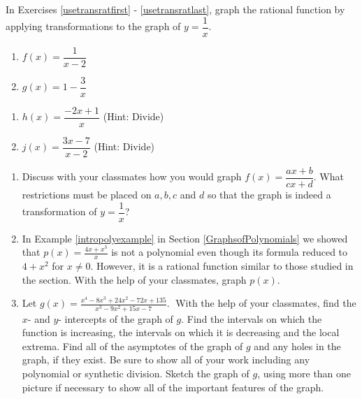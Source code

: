 In Exercises \ref{usetransratfirst} - \ref{usetransratlast}, graph the rational function by applying transformations to the graph of $y = \dfrac{1}{x}$.

\begin{multicols}{2}
\begin{enumerate}
\setcounter{enumi}{\value{HW}}

\item $f(x) = \dfrac{1}{x - 2}$ \label{usetransratfirst}
\item $g(x) = 1 - \dfrac{3}{x}$

\setcounter{HW}{\value{enumi}}
\end{enumerate}
\end{multicols}

\begin{multicols}{2}
\begin{enumerate}
\setcounter{enumi}{\value{HW}}


\item $h(x) = \dfrac{-2x + 1}{x}$ (Hint: Divide)
\item $j(x) = \dfrac{3x - 7}{x - 2}$ (Hint: Divide) \label{usetransratlast}


\setcounter{HW}{\value{enumi}}
\end{enumerate}
\end{multicols}


\begin{enumerate}
\setcounter{enumi}{\value{HW}}

\item Discuss with your classmates how you would graph $f(x) = \dfrac{ax + b}{cx + d}$.  What restrictions must be placed on $a, b, c$ and $d$ so that the graph is indeed a transformation of $y = \dfrac{1}{x}$?

\item In Example \ref{intropolyexample} in Section \ref{GraphsofPolynomials} we showed that $p(x) = \frac{4x+x^3}{x}$ is not a polynomial even though its formula reduced to $4 + x^{2}$ for $x \neq 0$.  However, it is a rational function similar to those studied in the section.  With the help of your classmates, graph $p(x)$.

\item Let $g(x) = \displaystyle \frac{x^{4} - 8x^{3} + 24x^{2} - 72x + 135}{x^{3} - 9x^{2} + 15x - 7}.\;$  With the help of your classmates, find the $x$- and $y$- intercepts of the graph of $g$.  Find the intervals on which the function is increasing, the intervals on which it is decreasing and the local extrema. Find all of the asymptotes of the graph of $g$ and any holes in the graph, if they exist.  Be sure to show all of your work including any polynomial or synthetic division.  Sketch the graph of $g$, using more than one picture if necessary to show all of the important features of the graph.

\setcounter{HW}{\value{enumi}}
\end{enumerate}

